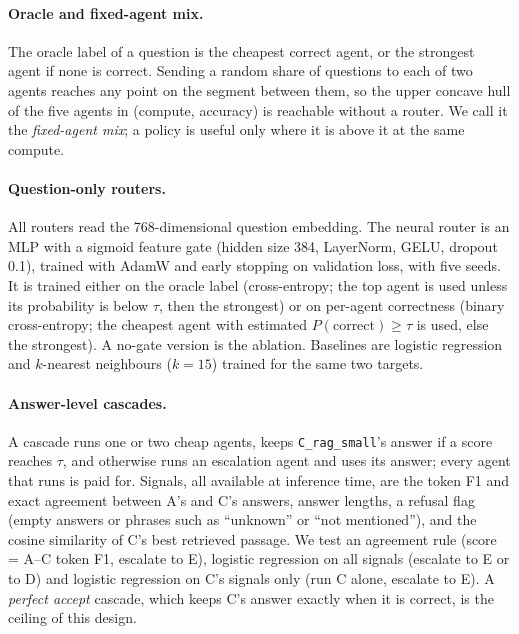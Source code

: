 \documentclass[11pt,a4paper]{article}
\newcommand{\code}[1]{\texttt{#1}}
\begin{document}
\paragraph{Oracle and fixed-agent mix.} The oracle label of a question is the cheapest correct agent, or the
strongest agent if none is correct. Sending a random share of questions to each of two agents reaches any point on
the segment between them, so the upper concave hull of the five agents in (compute, accuracy) is reachable without a
router. We call it the \emph{fixed-agent mix}; a policy is useful only where it is above it at the same compute.

\paragraph{Question-only routers.} All routers read the 768-dimensional question embedding. The neural router is an
MLP with a sigmoid feature gate (hidden size 384, LayerNorm, GELU, dropout 0.1), trained with AdamW and early
stopping on validation loss, with five seeds. It is trained either on the oracle label (cross-entropy; the top agent
is used unless its probability is below $\tau$, then the strongest) or on per-agent correctness (binary
cross-entropy; the cheapest agent with estimated $P(\text{correct}) \ge \tau$ is used, else the strongest). A
no-gate version is the ablation. Baselines are logistic regression and $k$-nearest neighbours ($k=15$) trained for
the same two targets.

\paragraph{Answer-level cascades.} A cascade runs one or two cheap agents, keeps \code{C\_rag\_small}'s answer if a
score reaches $\tau$, and otherwise runs an escalation agent and uses its answer; every agent that runs is paid for.
Signals, all available at inference time, are the token F1 and exact agreement between A's and C's answers, answer
lengths, a refusal flag (empty answers or phrases such as ``unknown'' or ``not mentioned''), and the cosine similarity
of C's best retrieved passage. We test an agreement rule (score = A--C token F1, escalate to E), logistic regression
on all signals (escalate to E or to D) and logistic regression on C's signals only (run C alone, escalate to E). A
\emph{perfect accept} cascade, which keeps C's answer exactly when it is correct, is the ceiling of this design.
\end{document}
